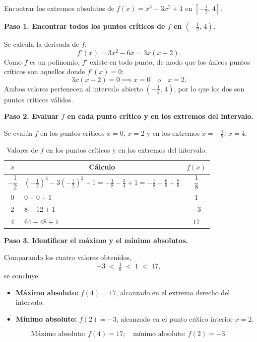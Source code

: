 \begin{example}
Encontrar los extremos absolutos de $f(x)=x^3-3x^2+1$ en
$\left[-\tfrac{1}{2},\,4\right]$.
\begin{myproof}
\textbf{Paso 1. Encontrar todos los puntos críticos de $f$ en
$\left(-\tfrac{1}{2},\,4\right)$.}

Se calcula la derivada de $f$:
\[
f'(x) = 3x^2 - 6x = 3x(x-2).
\]
Como $f$ es un polinomio, $f'$ existe en todo punto, de modo que los
únicos puntos críticos son aquellos donde $f'(x)=0$:
\[
3x(x-2)=0 \implies x=0 \quad \text{o} \quad x=2.
\]
Ambos valores pertenecen al intervalo abierto
$\left(-\tfrac{1}{2},\,4\right)$, por lo que los dos son puntos críticos
válidos.

\textbf{Paso 2. Evaluar $f$ en cada punto crítico y en los extremos
del intervalo.}

Se evalúa $f$ en los puntos críticos $x=0$, $x=2$ y en los extremos
$x=-\tfrac{1}{2}$, $x=4$:

\begin{table}[H]
\centering
\begin{tabular}{c l c}
\toprule
$x$ & \multicolumn{1}{c}{Cálculo} & $f(x)$ \\
\midrule
$-\dfrac{1}{2}$ &
  $\left(-\tfrac{1}{2}\right)^3 - 3\left(-\tfrac{1}{2}\right)^2+1
   = -\tfrac{1}{8}-\tfrac{3}{4}+1
   = -\tfrac{1}{8}-\tfrac{6}{8}+\tfrac{8}{8}$ &
  $\dfrac{1}{8}$ \\[10pt]
$0$ & $0 - 0 + 1$ & $1$ \\[6pt]
$2$ & $8 - 12 + 1$ & $-3$ \\[6pt]
$4$ & $64 - 48 + 1$ & $17$ \\
\bottomrule
\end{tabular}
\caption{Valores de $f$ en los puntos críticos y en los extremos del intervalo.}
\end{table}

\textbf{Paso 3. Identificar el máximo y el mínimo absolutos.}

Comparando los cuatro valores obtenidos,
\[
-3 \;<\; \tfrac{1}{8} \;<\; 1 \;<\; 17,
\]
se concluye:
\begin{itemize}
    \item \textbf{Máximo absoluto:} $f(4)=17$, alcanzado en el extremo
    derecho del intervalo.
    \item \textbf{Mínimo absoluto:} $f(2)=-3$, alcanzado en el punto
    crítico interior $x=2$.
\end{itemize}
\[
\boxed{\text{Máximo absoluto: }f(4)=17;\quad\text{mínimo absoluto: }f(2)=-3.}
\]
\end{myproof}
\end{example}

